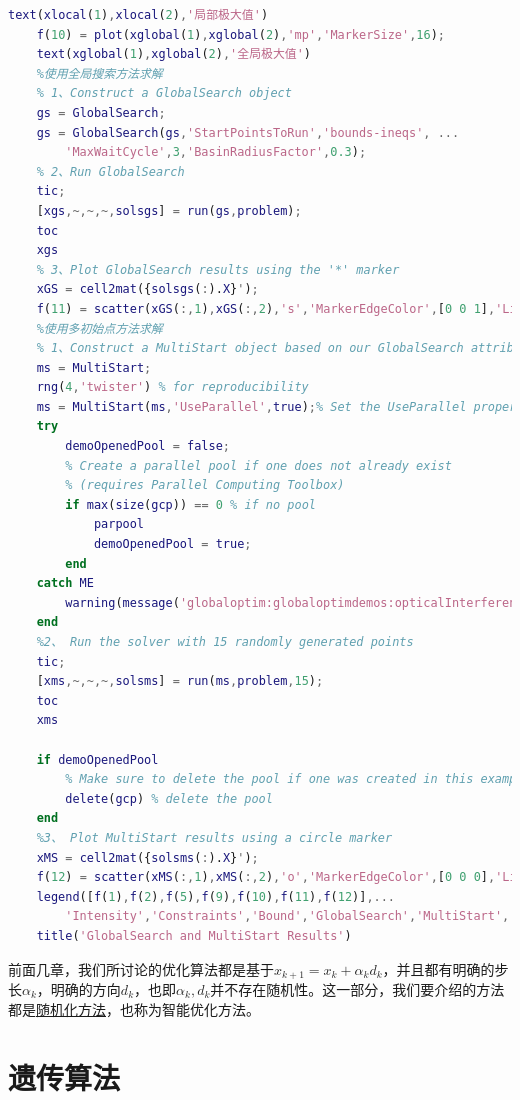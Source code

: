 \begin{lstlisting}[language=Matlab]
    text(xlocal(1),xlocal(2),'局部极大值')
    f(10) = plot(xglobal(1),xglobal(2),'mp','MarkerSize',16);
    text(xglobal(1),xglobal(2),'全局极大值')
    %使用全局搜索方法求解
    % 1、Construct a GlobalSearch object
    gs = GlobalSearch;
    gs = GlobalSearch(gs,'StartPointsToRun','bounds-ineqs', ...
        'MaxWaitCycle',3,'BasinRadiusFactor',0.3);
    % 2、Run GlobalSearch
    tic;
    [xgs,~,~,~,solsgs] = run(gs,problem);
    toc
    xgs
    % 3、Plot GlobalSearch results using the '*' marker
    xGS = cell2mat({solsgs(:).X}');
    f(11) = scatter(xGS(:,1),xGS(:,2),'s','MarkerEdgeColor',[0 0 1],'LineWidth',1.25);
    %使用多初始点方法求解
    % 1、Construct a MultiStart object based on our GlobalSearch attributes
    ms = MultiStart;
    rng(4,'twister') % for reproducibility
    ms = MultiStart(ms,'UseParallel',true);% Set the UseParallel property of MultiStart
    try
        demoOpenedPool = false;
        % Create a parallel pool if one does not already exist
        % (requires Parallel Computing Toolbox)
        if max(size(gcp)) == 0 % if no pool
            parpool
            demoOpenedPool = true;
        end
    catch ME
        warning(message('globaloptim:globaloptimdemos:opticalInterferenceDemo:noPCT'));
    end
    %2、 Run the solver with 15 randomly generated points
    tic;
    [xms,~,~,~,solsms] = run(ms,problem,15);
    toc
    xms

    if demoOpenedPool
        % Make sure to delete the pool if one was created in this example
        delete(gcp) % delete the pool
    end
    %3、 Plot MultiStart results using a circle marker
    xMS = cell2mat({solsms(:).X}');
    f(12) = scatter(xMS(:,1),xMS(:,2),'o','MarkerEdgeColor',[0 0 0],'LineWidth',1.25);
    legend([f(1),f(2),f(5),f(9),f(10),f(11),f(12)],...
        'Intensity','Constraints','Bound','GlobalSearch','MultiStart','Location','best')
    title('GlobalSearch and MultiStart Results')
    \end{lstlisting}
    \par
    前面几章，我们所讨论的优化算法都是基于$x_{k+1}=x_k+{\alpha}_kd_k$，并且都有明确的步长${\alpha}_k$，明确的方向$d_k$，也即${\alpha}_k,d_k$并不存在随机性。这一部分，我们要介绍的方法都是\underline{随机化方法}，也称为智能优化方法。
\section{遗传算法}
